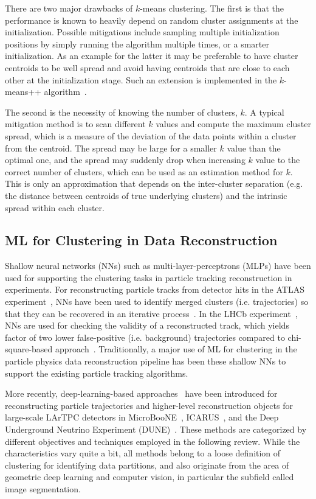 \documentclass{ws-rv9x6}
\begin{document}
There are two major drawbacks of $k$-means clustering. The first is that the performance is known to heavily depend on random cluster assignments at the initialization. Possible mitigations include sampling multiple initialization positions by simply running the algorithm multiple times, or a smarter initialization. As an example for the latter it may be preferable to have cluster centroids to be well spread and avoid having centroids that are close to each other at the initialization stage. Such an extension is implemented in the $k$-means++ algorithm~\cite{Arthur07k-means++:the}. 

The second is the necessity of knowing the number of clusters, $k$. A typical mitigation method is to scan different $k$ values and compute the maximum cluster spread, which is a measure of the deviation of the data points within a cluster from the centroid. The spread may be large for a smaller $k$ value than the optimal one, and the spread may suddenly drop when increasing $k$ value to the correct number of clusters, which can be used as an estimation method for $k$. This is only an approximation that depends on the inter-cluster separation (e.g. the distance between centroids of true underlying clusters) and the intrinsic spread within each cluster.

\subsection{ML for Clustering in Data Reconstruction}
Shallow neural networks (NNs) such as multi-layer-perceptrons (MLPs) have been used for supporting the clustering tasks in particle tracking reconstruction in experiments. For reconstructing particle tracks from detector hits in the ATLAS experiment~\cite{Collaboration_2008}, NNs have been used to identify merged clusters (i.e. trajectories) so that they can be recovered in an iterative process~\cite{Andreas_2015,Aabound_2017}. In the LHCb experiment~\cite{Alves:2008zz}, NNs are used for checking the validity of a reconstructed track, which yields factor of two lower false-positive (i.e. background) trajectories compared to chi-square-based approach~\cite{Stahl_2017}. Traditionally, a major use of ML for clustering in the particle physics data reconstruction pipeline has been these shallow NNs to support the existing particle tracking algorithms.

More recently, deep-learning-based approaches~\cite{domine_laura_2018_1300713,Domine:2020tlx,collaboration2020vertexfinding,PhysRevD.99.092001,PhysRevD.102.012005,koh2020scalable,drielsma2020clustering} have been introduced for reconstructing particle trajectories and higher-level reconstruction objects for large-scale LArTPC detectors in MicroBooNE~\cite{uboone}, ICARUS~\cite{icarus}, and the Deep Underground Neutrino Experiment (DUNE)~\cite{dune}. These methods are categorized by different objectives and techniques employed in the following review. While the characteristics vary quite a bit, all methods belong to a loose definition of clustering for identifying data partitions, and also originate from the area of geometric deep learning and computer vision, in particular the subfield called image segmentation.
\end{document}
